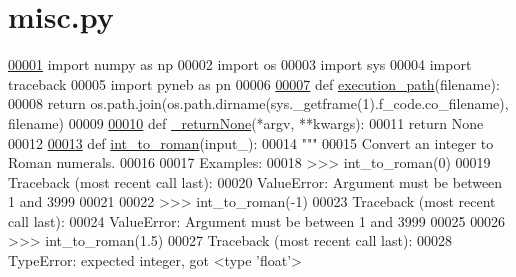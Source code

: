 \hypertarget{misc_8py_source}{}\section{misc.\+py}
\label{misc_8py_source}

\begin{DoxyCode}
\hypertarget{misc_8py_source_l00001}{}\hyperlink{namespacepyneb_1_1utils_1_1misc}{00001} \textcolor{keyword}{import} numpy \textcolor{keyword}{as} np
00002 \textcolor{keyword}{import} os
00003 \textcolor{keyword}{import} sys
00004 \textcolor{keyword}{import} traceback
00005 \textcolor{keyword}{import} pyneb \textcolor{keyword}{as} pn
00006 
\hypertarget{misc_8py_source_l00007}{}\hyperlink{namespacepyneb_1_1utils_1_1misc_a0e9572755930aabb03c6b0e5d66b8356}{00007} \textcolor{keyword}{def }\hyperlink{namespacepyneb_1_1utils_1_1misc_a0e9572755930aabb03c6b0e5d66b8356}{execution\_path}(filename):
00008     \textcolor{keywordflow}{return} os.path.join(os.path.dirname(sys.\_getframe(1).f\_code.co\_filename), filename)
00009 
\hypertarget{misc_8py_source_l00010}{}\hyperlink{namespacepyneb_1_1utils_1_1misc_adca84ea86408b88ee4f54583e19d4a18}{00010} \textcolor{keyword}{def }\hyperlink{namespacepyneb_1_1utils_1_1misc_adca84ea86408b88ee4f54583e19d4a18}{\_returnNone}(*argv, **kwargs):
00011     \textcolor{keywordflow}{return} \textcolor{keywordtype}{None}
00012 
\hypertarget{misc_8py_source_l00013}{}\hyperlink{namespacepyneb_1_1utils_1_1misc_aec4e973d4cb9299f749ef190ea636a06}{00013} \textcolor{keyword}{def }\hyperlink{namespacepyneb_1_1utils_1_1misc_aec4e973d4cb9299f749ef190ea636a06}{int\_to\_roman}(input\_):
00014     \textcolor{stringliteral}{"""}
00015 \textcolor{stringliteral}{    Convert an integer to Roman numerals.}
00016 \textcolor{stringliteral}{    }
00017 \textcolor{stringliteral}{    Examples:}
00018 \textcolor{stringliteral}{    >>> int\_to\_roman(0)}
00019 \textcolor{stringliteral}{    Traceback (most recent call last):}
00020 \textcolor{stringliteral}{    ValueError: Argument must be between 1 and 3999}
00021 \textcolor{stringliteral}{    }
00022 \textcolor{stringliteral}{    >>> int\_to\_roman(-1)}
00023 \textcolor{stringliteral}{    Traceback (most recent call last):}
00024 \textcolor{stringliteral}{    ValueError: Argument must be between 1 and 3999}
00025 \textcolor{stringliteral}{    }
00026 \textcolor{stringliteral}{    >>> int\_to\_roman(1.5)}
00027 \textcolor{stringliteral}{    Traceback (most recent call last):}
00028 \textcolor{stringliteral}{    TypeError: expected integer, got <type 'float'>}

\end{DoxyCode}
